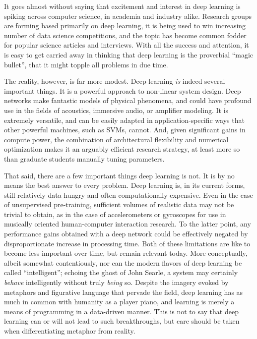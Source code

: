 It goes almost without saying that excitement and interest in deep learning is spiking across computer science, in academia and industry alike.
Research groups are forming based primarily on deep learning, it is being used to win increasing number of data science competitions, and the topic has become common fodder for popular science articles and interviews.
With all the success and attention, it is easy to get carried away in thinking that deep learning is the proverbial ``magic bullet'', that it might topple all problems in due time.

The reality, however, is far more modest.
Deep learning \emph{is} indeed several important things.
It is a powerful approach to non-linear system design.
Deep networks make fantastic models of physical phenomena, and could have profound use in the fields of acoustics, immersive audio, or amplifier modeling.
It is extremely versatile, and can be easily adapted in application-specific ways that other powerful machines, such as SVMs, cannot.
And, given significant gains in compute power, the combination of architectural flexibility and numerical optimization makes it an arguably efficient research strategy, at least more so than graduate students manually tuning parameters.

That said, there are a few important things deep learning is not.
It is by no means the best answer to every problem.
Deep learning is, in its current forms, still relatively data hungry and often computationally expensive.
Even in the case of unsupervised pre-training, sufficient volumes of realistic data may not be trivial to obtain, as in the case of accelerometers or gyroscopes for use in musically oriented human-computer interaction research.
To the latter point, any performance gains obtained with a deep network could be effectively negated by disproportionate increase in processing time.
Both of these limitations are like to become less important over time, but remain relevant today.
More conceptually, albeit somewhat contentiously, nor can the modern flavors of deep learning be called ``intelligent'';
echoing the ghost of John Searle, a system may certainly \emph{behave} intelligently without truly \emph{being} so.
Despite the imagery evoked by metaphors and figurative language that pervade the field, deep learning has as much in common with humanity as a player piano, and learning is merely a means of programming in a data-driven manner.
This is not to say that deep learning can or will not lead to such breakthroughs, but care should be taken when differentiating metaphor from reality.

